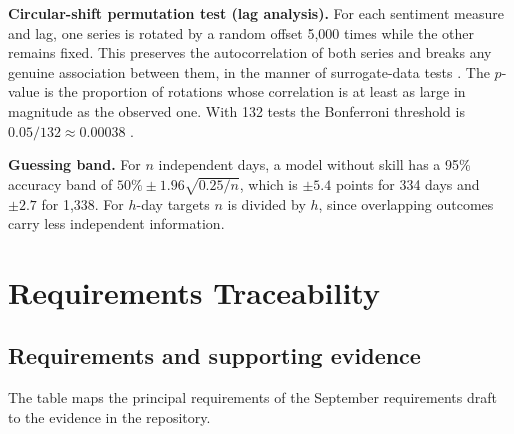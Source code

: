 \textbf{Circular-shift permutation test (lag analysis).} For each sentiment measure and lag, one series is rotated by a random offset 5,000 times while the other remains fixed. This preserves the autocorrelation of both series and breaks any genuine association between them, in the manner of surrogate-data tests \cite{theiler1992}. The $p$-value is the proportion of rotations whose correlation is at least as large in magnitude as the observed one. With 132 tests the Bonferroni threshold is $0.05/132\approx0.00038$ \cite{dunn1961}.

\textbf{Guessing band.} For $n$ independent days, a model without skill has a 95\% accuracy band of $50\%\pm1.96\sqrt{0.25/n}$, which is $\pm5.4$ points for 334 days and $\pm2.7$ for 1,338. For $h$-day targets $n$ is divided by $h$, since overlapping outcomes carry less independent information.

\section{Requirements Traceability}
\label{app:trace}
\subsection{Requirements and supporting evidence}
The table maps the principal requirements of the September requirements draft to the evidence in the repository.

